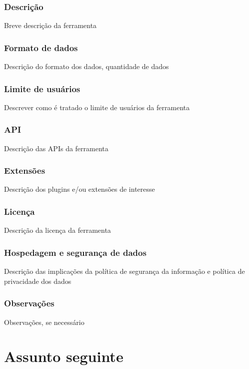 \documentclass[a4paper, 12pt]{article}
\begin{document}
\subsubsection{Descrição}
Breve descrição da ferramenta

\subsubsection{Formato de dados}
Descrição do formato dos dados, quantidade de dados

\subsubsection{Limite de usuários}
Descrever como é tratado o limite de usuários da ferramenta

\subsubsection{API}
Descrição das APIs da ferramenta

\subsubsection{Extensões}
Descrição dos plugins e/ou extensões de interesse

\subsubsection{Licença}
Descrição da licença da ferramenta

\subsubsection{Hospedagem e segurança de dados}
Descrição das implicações da política de segurança da informação e política de privacidade dos dados

\subsubsection{Observações}
Observações, se necessário

\clearpage


\section{Assunto seguinte}
\end{document}
